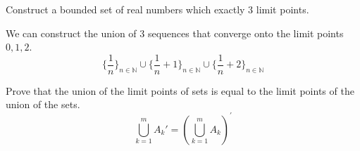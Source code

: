 \documentclass{article}
\begin{document}
    \begin{exercise}[Rudin 2.5]
    Construct a bounded set of real numbers which exactly 3 limit points. 
    \end{exercise}
    \begin{solution}
    We can construct the union of 3 sequences that converge onto the limit points $0, 1, 2$. 
    \[\big\{ \frac{1}{n} \big\}_{n \in \mathbb{N}} \cup \big\{ \frac{1}{n} + 1\}_{n \in \mathbb{N}} \cup \big\{ \frac{1}{n} + 2 \big\}_{n \in \mathbb{N}}\]
    \end{solution}

    \begin{exercise}
    Prove that the union of the limit points of sets is equal to the limit points of the union of the sets. 
    \[\bigcup_{k=1}^m A_k'=\left(\bigcup_{k=1}^m A_k\right)^{\!\prime}\]
    \end{exercise}
\end{document}
